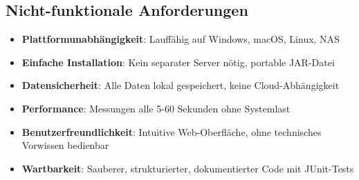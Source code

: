 \subsection{Nicht-funktionale Anforderungen}
\begin{itemize}
    \item \textbf{Plattformunabhängigkeit}: Lauffähig auf Windows, macOS, Linux, NAS
    \item \textbf{Einfache Installation}: Kein separater Server nötig, portable JAR-Datei
    \item \textbf{Datensicherheit}: Alle Daten lokal gespeichert, keine Cloud-Abhängigkeit
    \item \textbf{Performance}: Messungen alle 5-60 Sekunden ohne Systemlast
    \item \textbf{Benutzerfreundlichkeit}: Intuitive Web-Oberfläche, ohne technisches Vorwissen bedienbar
    \item \textbf{Wartbarkeit}: Sauberer, strukturierter, dokumentierter Code mit JUnit-Tests
\end{itemize}